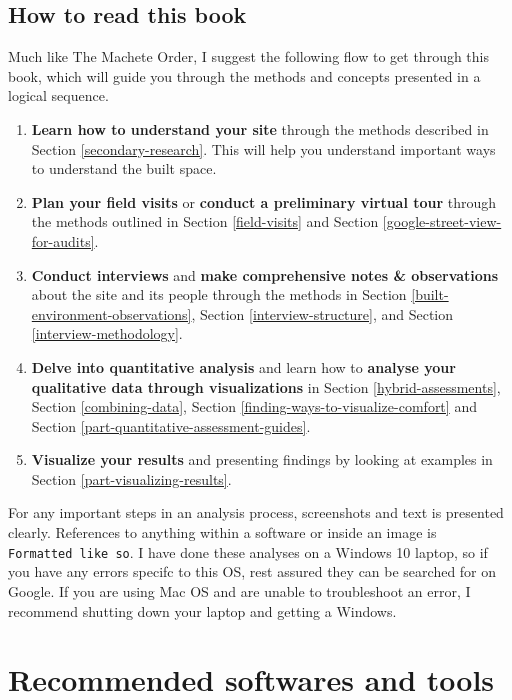 \documentclass[
]{latex/krantz}
\providecommand{\tightlist}{%
  \setlength{\itemsep}{0pt}\setlength{\parskip}{0pt}}
\begin{document}
\hypertarget{how-to-read-this-book}{%
\subsection{How to read this book}\label{how-to-read-this-book}}

Much like The Machete Order, I suggest the following flow to get through this book, which will guide you through the methods and concepts presented in a logical sequence.

\begin{enumerate}
\def\labelenumi{\arabic{enumi}.}
\tightlist
\item
  \textbf{Learn how to understand your site} through the methods described in Section \ref{secondary-research}. This will help you understand important ways to understand the built space.
\item
  \textbf{Plan your field visits} or \textbf{conduct a preliminary virtual tour} through the methods outlined in Section \ref{field-visits} and Section \ref{google-street-view-for-audits}.
\item
  \textbf{Conduct interviews} and \textbf{make comprehensive notes \& observations} about the site and its people through the methods in Section \ref{built-environment-observations}, Section \ref{interview-structure}, and Section \ref{interview-methodology}.
\item
  \textbf{Delve into quantitative analysis} and learn how to \textbf{analyse your qualitative data through visualizations} in Section \ref{hybrid-assessments}, Section \ref{combining-data}, Section \ref{finding-ways-to-visualize-comfort} and Section \ref{part-quantitative-assessment-guides}.
\item
  \textbf{Visualize your results} and presenting findings by looking at examples in Section \ref{part-visualizing-results}.
\end{enumerate}

For any important steps in an analysis process, screenshots and text is presented clearly. References to anything within a software or inside an image is \texttt{Formatted\ like\ so}. I have done these analyses on a Windows 10 laptop, so if you have any errors specifc to this OS, rest assured they can be searched for on Google. If you are using Mac OS and are unable to troubleshoot an error, I recommend shutting down your laptop and getting a Windows.

\hypertarget{recommended-softwares-and-tools}{%
\section{Recommended softwares and tools}\label{recommended-softwares-and-tools}}
\end{document}
